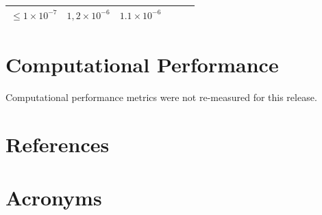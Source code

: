 \documentclass[DM,toc]{lsstdoc}
\begin{document}
\begin{longtable}[]{@{}llllll@{}}
\begin{minipage}[t]{0.14\columnwidth}
\(\leq 1\times10^{-7}\)\strut
\end{minipage} & \begin{minipage}[t]{0.12\columnwidth}\raggedright\strut
\(1,2\times10^{-6}\)\strut
\end{minipage} & \begin{minipage}[t]{0.12\columnwidth}\raggedright\strut
\(1.1\times10^{-6}\)\strut
\end{minipage} & \begin{minipage}[t]{0.17\columnwidth}\raggedright\strut
\strut
\end{minipage}\tabularnewline
\bottomrule
\end{longtable}

\section{Computational Performance}\label{computational-performance}

Computational performance metrics were not re-measured for this release.

\appendix

\section{References} \label{sec:bib}
\renewcommand{\refname}{} %


\section{Acronyms} \label{sec:acronyms}

\end{document}
